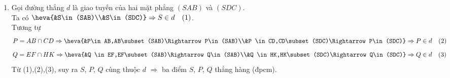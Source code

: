 \begin{bt}
{\begin{enumerate}
			Tương tự
			$$M=AD\cap BC \Rightarrow \heva{&M\in AD,AD\subset (SAD)\Rightarrow M\in(SAD)\\&M \in BC,BC\subset (SBC)\Rightarrow M\in(SBC)}\Rightarrow M\in d\quad (2)$$
			$$N=EK\cap FH \Rightarrow \heva{&N \in EK,EK\subset (SAD)\Rightarrow N\in(SAD)\\&N \in FH,FH\subset (SBC)\Rightarrow N\in(SBC)}\Rightarrow N\in d\quad (3)$$
			Từ (1),(2),(3), suy ra $S$, $M$, $N$ cùng thuộc $d$ $\Rightarrow$ ba điểm $S$, $M$, $N$ thẳng hàng (đpcm).
			\item Gọi đường thẳng $d$ là giao tuyến của hai mặt phẳng $(SAB)$ và $(SDC)$.\\
			Ta có 
			$\heva{&S\in(SAB)\\&S\in(SDC)}\Rightarrow S\in d\quad (1)$.\\
			Tương tự
			$$P=AB\cap CD \Rightarrow \heva{&P\in AB,AB\subset (SAB)\Rightarrow P\in(SAB)\\&P \in CD,CD\subset (SDC)\Rightarrow P\in(SDC)}\Rightarrow P\in d\quad (2)$$
			$$Q=EF\cap HK \Rightarrow \heva{&Q \in EF,EF\subset (SAB)\Rightarrow Q\in(SAB)\\&Q \in HK,HK\subset (SDC)\Rightarrow Q\in(SDC)}\Rightarrow Q\in d\quad (3)$$
			Từ (1),(2),(3), suy ra $S$, $P$, $Q$ cùng thuộc $d$ $\Rightarrow$ ba điểm $S$, $P$, $Q$ thẳng hàng (đpcm).
		\end{enumerate}	
	}
\end{bt}
